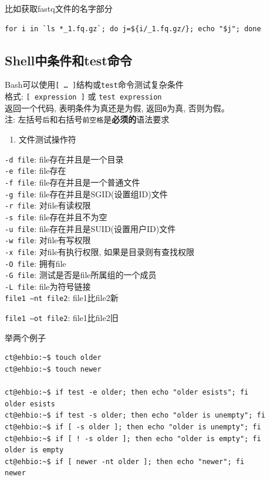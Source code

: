 \documentclass[]{article}
\providecommand{\tightlist}{%
  \setlength{\itemsep}{0pt}\setlength{\parskip}{0pt}}
\numberwithin{figure}{section}
\numberwithin{table}{section}
\begin{document}
比如获取fastq文件的名字部分

\begin{verbatim}
for i in `ls *_1.fq.gz`; do j=${i/_1.fq.gz/}; echo "$j"; done
\end{verbatim}

\hypertarget{bash_logic}{%
\subsection{Shell中条件和test命令}\label{bash_logic}}

Bash可以使用\texttt{{[}\ \ldots{}\ {]}}结构或\texttt{test}命令测试复杂条件\\
格式: \texttt{{[}\ expression\ {]}} 或 \texttt{test\ expression}\\
返回一个代码, 表明条件为真还是为假, 返回\texttt{0}为真, 否则为假。\\
注: 左括号\texttt{后}和右括号\texttt{前空格}是\textbf{必须的}语法要求

\begin{enumerate}
\def\labelenumi{\arabic{enumi}.}
\tightlist
\item
  文件测试操作符
\end{enumerate}

\texttt{-d\ file}: file存在并且是一个目录\\
\texttt{-e\ file}: file存在\\
\texttt{-f\ file}: file存在并且是一个普通文件\\
\texttt{-g\ file}: file存在并且是SGID(设置组ID)文件\\
\texttt{-r\ file}: 对file有读权限\\
\texttt{-s\ file}: file存在并且不为空\\
\texttt{-u\ file}: file存在并且是SUID(设置用户ID)文件\\
\texttt{-w\ file}: 对file有写权限\\
\texttt{-x\ file}: 对file有执行权限, 如果是目录则有查找权限\\
\texttt{-O\ file}: 拥有file\\
\texttt{-G\ file}: 测试是否是file所属组的一个成员\\
\texttt{-L\ file}: file为符号链接\\
\texttt{file1\ –nt\ file2}: file1比file2新

\texttt{file1\ –ot\ file2}: file1比file2旧

举两个例子

\begin{verbatim}
ct@ehbio:~$ touch older
ct@ehbio:~$ touch newer

ct@ehbio:~$ if test -e older; then echo "older esists"; fi
older esists
ct@ehbio:~$ if test -s older; then echo "older is unempty"; fi
ct@ehbio:~$ if [ -s older ]; then echo "older is unempty"; fi
ct@ehbio:~$ if [ ! -s older ]; then echo "older is empty"; fi
older is empty
ct@ehbio:~$ if [ newer -nt older ]; then echo "newer"; fi
newer
\end{verbatim}
\end{document}
